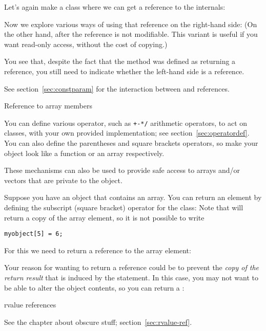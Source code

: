 Let's again make a class where we can get a reference to the
internals:
%

Now we explore various ways of using that reference on the right-hand
side:
%
%
(On the other hand, after  the reference is not
modifiable. This variant is useful if you want read-only access,
without the cost of copying.)

You see that, despite the fact that the method  was defined as
returning a reference, you still need to indicate whether the
left-hand side is a reference.

See section~\ref{sec:constparam} for the interaction between 
and references.

 {Reference to array members}
\label{sec:overloadbracket}

You can define various operator, such as \verb.+-*/. arithmetic
operators, to act on classes, with your own provided implementation;
see section~\ref{sec:operatordef}. You can also define the parentheses
and square brackets operators, so make your object look like a
function or an array respectively.

These mechanisms can also be used to provide safe access to arrays
and/or vectors that are private to the object.

Suppose you have an object that contains an  array. You can
return an element by defining the subscript (square bracket) operator
for the class:
%
%
Note that  will return a copy of the array element,
so it is not possible to write
\begin{lstlisting}
myobject[5] = 6;
\end{lstlisting}
For this we need to return a reference to the array element:
%

Your reason for wanting to return a reference could be to prevent the
\emph{copy of the return result}
that is induced by the  statement.
In this case, you may not want to be able to alter the object
contents, so you can return a :
%

 {rvalue references}

See the chapter about obscure stuff; section~\ref{sec:rvalue-ref}.
